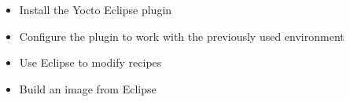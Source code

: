 {
  \begin{itemize}
    \item Install the Yocto Eclipse plugin
    \item Configure the plugin to work with the previously used
      environment
    \item Use Eclipse to modify recipes
    \item Build an image from Eclipse
  \end{itemize}
}
